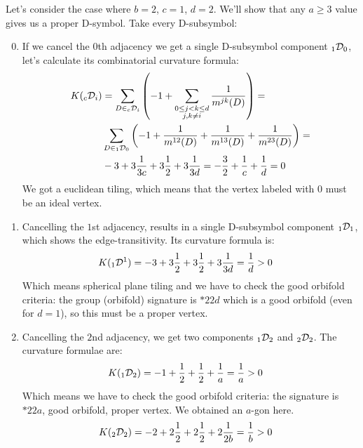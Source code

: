 \documentclass[12pt,a4paper]{article}
\numberwithin{equation}{section}
\newcommand{\leftsub}[2]{{\vphantom{#2}}_{#1}{#2}}
\theoremstyle{plain}%
\theoremstyle{definition}
\theoremstyle{remark}
\begin{document}
Let's consider the case where $b=2$, $c=1$, $d=2$. We'll show that any $a\geq3$ value
gives us a proper D-symbol. Take every D-subsymbol:
\begin{enumerate}
  \setcounter{enumi}{-1}
  \item If we cancel the $0$th adjacency we get a single D-subsymbol component
    $\leftsub{1}{\mathcal{D}}_0$, let's calculate its combinatorial curvature
    formula:
    \begin{align*}
      K(\leftsub{c}{\mathcal{D}}_i)&=\sum_{D\in
      \leftsub{c}{\mathcal{D}}_i}\left(-1+\sum_{\substack{0\le j<k\le d \\ j,k\ne i}}\frac{1}{m^{jk}(D)}\right)= \\
      &
      \sum_{D\in\leftsub{1}{\mathcal{D}}_0}\left(-1+\frac{1}{m^{12}(D)}+\frac{1}{m^{13}(D)}+\frac{1}{m^{23}(D)}\right)= \\
      & -3 + 3\frac{1}{3c} + 3\frac{1}{2} + 3\frac{1}{3d} = -\frac{3}{2}+\frac{1}{c}+\frac{1}{d} = 0
    \end{align*}
    We got a euclidean tiling, which means that the vertex labeled with $0$ must
    be an ideal vertex.
  \item Cancelling the $1$st adjacency, results in a single D-subsymbol
    component $\leftsub{1}{\mathcal{D}}_1$, which
    shows the edge-transitivity. Its curvature formula is:
    \begin{align*}
      K(\leftsub{1}{\mathcal{D}^1})&= -3 + 3\frac{1}{2} + 3\frac{1}{2} +
      3\frac{1}{3d} = \frac{1}{d} > 0
    \end{align*}
    Which means spherical plane tiling and we have to check the good orbifold
    criteria: the group (orbifold) signature is
    $*22d$ which is a good orbifold (even for $d=1$), so this must be a proper vertex.
  \item Cancelling the $2$nd adjacency, we get two components
    $\leftsub{1}{\mathcal{D}}_2$ and $\leftsub{2}{\mathcal{D}}_2$. The curvature formulae are:
    \begin{align*}
      K(\leftsub{1}{\mathcal{D}}_2)&= -1 + \frac{1}{2} + \frac{1}{2} +
      \frac{1}{a} = \frac{1}{a} > 0
    \end{align*}
    Which means we have to check the good orbifold criteria: the signature is
    $*22a$, good orbifold, proper vertex. We obtained an $a$-gon here.
    \begin{align*}
      K(\leftsub{2}{\mathcal{D}}_2)&= -2 + 2\frac{1}{2} + 2\frac{1}{2} +
      2\frac{1}{2b} = \frac{1}{b} > 0
    \end{align*}

\end{enumerate}
\end{document}
